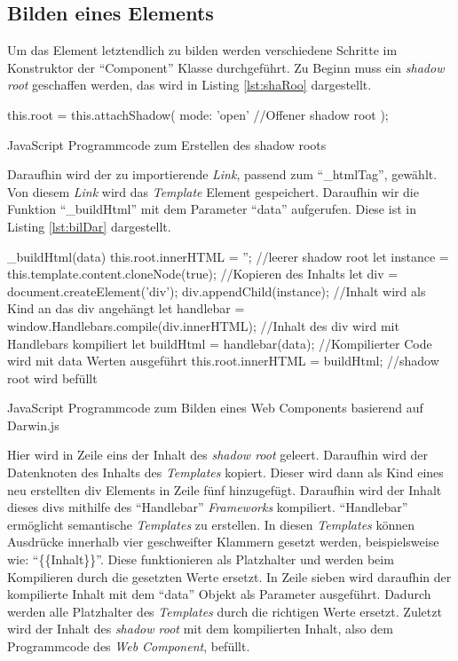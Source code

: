\documentclass[12pt, paper=a4, bibtotoc, toc=listof, headsepline=true]{scrreprt}
\begin{document}
	\subsection{Bilden eines Elements}
	Um das Element letztendlich zu bilden werden verschiedene Schritte im Konstruktor der \enquote{Component} Klasse durchgeführt. Zu Beginn muss ein \emph{shadow root} geschaffen werden, das wird in Listing \ref{lst:shaRoo} dargestellt.
	\begin{listing}
		\begin{JavaScriptcode*}{}
this.root = this.attachShadow({
   mode: 'open' //Offener shadow root
});
		\end{JavaScriptcode*}
		\caption[Erstellung des shadow roots]{JavaScript Programmcode zum Erstellen des shadow roots}
		\label{lst:shaRoo}  
	\end{listing}
	Daraufhin wird der zu importierende \emph{Link}, passend zum \enquote{\_htmlTag}, gewählt. Von diesem \emph{Link} wird das \emph{Template} Element gespeichert. Daraufhin wir die Funktion \enquote{\_buildHtml} mit dem Parameter \enquote{data} aufgerufen. Diese ist in Listing \ref{lst:bilDar} dargestellt.
		\begin{listing}
		\begin{JavaScriptcode*}{}
_buildHtml(data) {
   this.root.innerHTML = ''; //leerer shadow root
   let instance = this.template.content.cloneNode(true); //Kopieren des Inhalts
   let div = document.createElement('div'); 
   div.appendChild(instance); //Inhalt wird als Kind an das div angehängt
   let handlebar = window.Handlebars.compile(div.innerHTML); //Inhalt des div wird mit Handlebars kompiliert
   let buildHtml = handlebar(data); //Kompilierter Code wird mit data Werten ausgeführt
   this.root.innerHTML = buildHtml; //shadow root wird befüllt
}
		\end{JavaScriptcode*}
		\caption[Bilden des Web Components]{JavaScript Programmcode zum Bilden eines Web Components basierend auf Darwin.js}
		\label{lst:bilDar}
		\end{listing}
	Hier wird in Zeile eins der Inhalt des \emph{shadow root} geleert. Daraufhin wird der Datenknoten des Inhalts des \emph{Templates} kopiert. Dieser wird dann als Kind eines neu erstellten div Elements in Zeile fünf hinzugefügt. Daraufhin wird der Inhalt dieses divs mithilfe des \enquote{Handlebar} \emph{Frameworks} kompiliert. \enquote{Handlebar} ermöglicht semantische \emph{Templates} zu erstellen. In diesen \emph{Templates} können Ausdrücke innerhalb vier geschweifter Klammern gesetzt werden, beispielsweise wie: \enquote{\{\{Inhalt\}\}}. Diese funktionieren als Platzhalter und werden beim Kompilieren durch die gesetzten Werte ersetzt\cite{handlebars}. In Zeile sieben wird daraufhin der kompilierte Inhalt mit dem \enquote{data} Objekt als Parameter ausgeführt. Dadurch werden alle Platzhalter des \emph{Templates} durch die richtigen Werte ersetzt. Zuletzt wird der Inhalt des \emph{shadow root} mit dem kompilierten Inhalt, also dem Programmcode des \emph{Web Component}, befüllt.
\end{document}
